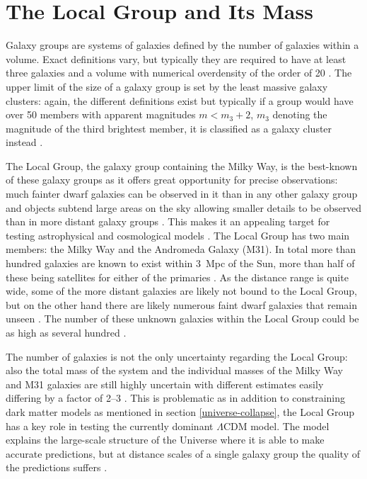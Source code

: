 \documentclass[english, oneside]{HYgradu}
\begin{document}
\section{The Local Group and Its Mass}
Galaxy groups are systems of galaxies defined by the number of galaxies within a volume. Exact definitions vary, but typically they are required to have at least three galaxies and a volume with numerical overdensity of the order of 20 \citep{mo2010galaxy}. The upper limit of the size of a galaxy group is set by the least massive galaxy clusters: again, the different definitions exist but typically if a group would have over 50 members with apparent magnitudes $m < m_3 +2$, $m_3$ denoting the magnitude of the third brightest member, it is classified as a galaxy cluster instead \citep{mo2010galaxy}.

The Local Group, the galaxy group containing the Milky Way, is the best-known of these galaxy groups as it offers great opportunity for precise observations: much fainter dwarf galaxies can be observed in it than in any other galaxy group and objects subtend large areas on the sky allowing smaller details to be observed than in more distant galaxy groups \citep{mo2010galaxy, mcconnachie2012observed}. This makes it an appealing target for testing astrophysical and cosmological models \citep{bullock2017small}. The Local Group has two main members: the Milky Way and the Andromeda Galaxy (M31). In total more than hundred galaxies are known to exist within 3~Mpc of the Sun, more than half of these being satellites for either of the primaries \citep{mcconnachie2012observed}. As the distance range is quite wide, some of the more distant galaxies are likely not bound to the Local Group, but on the other hand there are likely numerous faint dwarf galaxies that remain unseen \citep{mcconnachie2012observed}. The number of these unknown galaxies within the Local Group could be as high as several hundred \citep{tollerud2008hundreds}.

The number of galaxies is not the only uncertainty regarding the Local Group: also the total mass of the system and the individual masses of the Milky Way and M31 galaxies are still highly uncertain with different estimates easily differing by a factor of 2--3 \citep{wang2015estimating, carlesi2016constraining}. This is problematic as in addition to constraining dark matter models as mentioned in section \ref{universe-collapse}, the Local Group has a key role in testing the currently dominant $\Lambda$CDM model. The model explains the large-scale structure of the Universe where it is able to make accurate predictions, but at distance scales of a single galaxy group the quality of the predictions suffers \citep{bullock2017small}.
\end{document}
